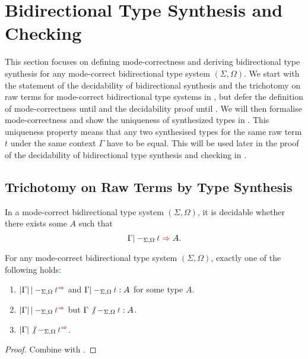 
\section{Bidirectional Type Synthesis and Checking} \label{sec:type-synthesis}
This section focuses on defining mode-correctness and deriving bidirectional type synthesis for any mode-correct bidirectional type system $(\Sigma, \Omega)$.
We start with the statement of the decidability of bidirectional synthesis and the trichotomy on raw terms for mode-correct bidirectional type systems in , but defer the definition of mode-correctness until  and the decidability proof until .
We will then formalise mode-correctness and show the uniqueness of synthesized types in .
This uniqueness property means that any two synthesised types for the same raw term $t$ under the same context $\Gamma$ have to be equal.
This will be used later in the proof of the decidability of bidirectional type synthesis and checking in .

\subsection{Trichotomy on Raw Terms by Type Synthesis} \label{subsec:trichotomy}

\begin{theorem} \label{thm:bidirectional-type-synthesis}
  In a mode-correct bidirectional type system $(\Sigma, \Omega)$,
  it is decidable whether there exists some $A$ such that
  \[
    \Gamma |-_{\Sigma, \Omega} \isTerm{t} \syn A.
  \]
\end{theorem}

\begin{corollary}\label{cor:trichotomy}
  For any mode-correct bidirectional type system $(\Sigma, \Omega)$, 
  exactly one of the following holds:
  \begin{enumerate}
    \item $\erase{\Gamma} |-_{\Sigma, \Omega} \isTerm{t}^{\syn}$ and\/ $\Gamma |-_{\Sigma, \Omega} \isTerm{t} : A$ for some type $A$.
    \item $\erase{\Gamma} |-_{\Sigma, \Omega} \isTerm{t}^{\syn}$ but\/ $\Gamma \not|-_{\Sigma, \Omega} \isTerm{t} : A$.
    \item $\erase{\Gamma} \not|-_{\Sigma, \Omega} \isTerm{t}^{\syn}$.
  \end{enumerate}
\end{corollary}
\begin{proof}
  Combine   with .
  
\end{proof}

